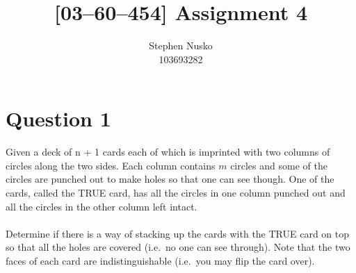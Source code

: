 \documentclass{article}
\title{[03--60--454] Assignment 4}
\author{Stephen Nusko \\ 103693282}
\begin{document}
	\thispagestyle{empty}
	\maketitle	
  \section{Question 1}
    Given a deck of n + 1 cards each of which is imprinted with two columns of circles along the
    two sides. Each column contains $m$ circles and some of the circles are punched out to make
    holes so that one can see though. One of the cards, called the TRUE card, has all the circles
    in one column punched out and all the circles in the other column left intact.\\
    \\
    Determine if there is a way of stacking up the cards with the TRUE card on top so that all
    the holes are covered (i.e.\ no one can see through). Note that the two faces of each card are
    indistinguishable (i.e.\ you may flip the card over).
\end{document}
